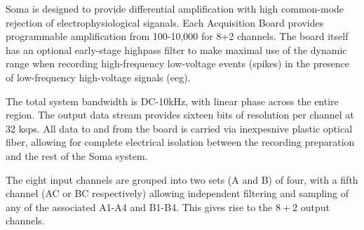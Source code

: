 
Soma is designed to provide differential amplification with high common-mode rejection of electrophysiological siganals. Each Acquisition Board provides programmable amplification from 100-10,000 for 8+2 channels. The board itself has an optional early-stage highpass filter to make maximal use of the dynamic range when recording high-frequency low-voltage events (spikes) in the presence of low-frequency high-voltage signals (eeg). 


The total system bandwidth is DC-10kHz, with linear phase across the entire region. The output data stream provides sixteen bits of resolution per channel at 32 ksps. All data to and from the board is carried via inexpesnive plastic optical fiber, allowing for complete electrical isolation between the recording preparation and the rest of the Soma system. 

The eight input channels are grouped into two sets (A and B) of four, with a fifth channel (AC or BC respectively) allowing independent filtering and sampling of any of the associated A1-A4 and B1-B4. This gives rise to the $8+2$ output channels. 

